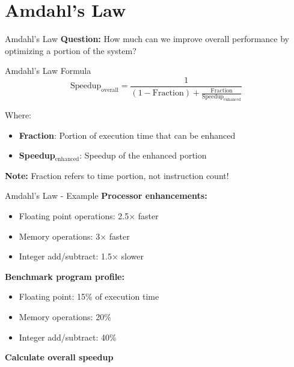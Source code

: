 \documentclass[aspectratio=169,12pt]{beamer}
\begin{document}
\section{Amdahl's Law}
\begin{frame}{Amdahl's Law}
\textbf{Question:} How much can we improve overall performance by optimizing a portion of the system?

\begin{block}{Amdahl's Law Formula}
$$\text{Speedup}_\text{overall} = \frac{1}{(1 - \text{Fraction}) + \frac{\text{Fraction}}{\text{Speedup}_\text{enhanced}}}$$
\end{block}

Where:
\begin{itemize}
    \item \textbf{Fraction}: Portion of execution time that can be enhanced
    \item \textbf{Speedup$_\text{enhanced}$}: Speedup of the enhanced portion
\end{itemize}

\textbf{Note:} Fraction refers to time portion, not instruction count!
\end{frame}

\begin{frame}{Amdahl's Law - Example}
\textbf{Processor enhancements:}
\begin{itemize}
    \item Floating point operations: 2.5× faster
    \item Memory operations: 3× faster
    \item Integer add/subtract: 1.5× slower
\end{itemize}

\textbf{Benchmark program profile:}
\begin{itemize}
    \item Floating point: 15\% of execution time
    \item Memory operations: 20\%
    \item Integer add/subtract: 40\%
\end{itemize}

\textbf{Calculate overall speedup}
\end{frame}
\end{document}
